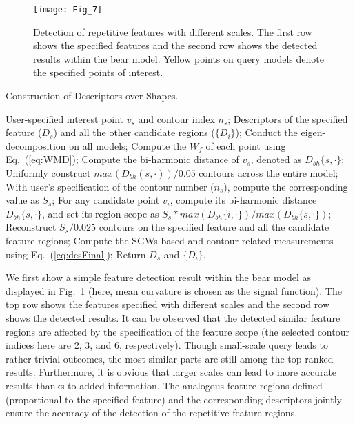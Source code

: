 \begin{figure}[!to]
\texttt{[image: Fig\_7]}
\caption[Detection of repetitive features with different scales.]
  {Detection of repetitive features with different scales. The
  first row shows the specified features and the second row shows the
  detected results within the bear model. Yellow points on query
  models denote the specified points of interest.}
\label{scales}
\end{figure}


\begin{algorithm}
\caption{Construction of Descriptors over Shapes.}
\label{alg:Framwork}
\begin{algorithmic}[1]
\REQUIRE User-specified interest point $v_{s}$ and contour index $n_{s}$;
\ENSURE  Descriptors of the specified feature ($D_{s}$) and all
         the other candidate regions ($\{D_{i}\}$);
\STATE Conduct the eigen-decomposition on all models;
\STATE Compute the $W_f$ of each point using Eq.~(\ref{eq:WMD});
\STATE Compute the bi-harmonic distance of $v_{s}$, denoted as $D_{bh}\{s,\cdot\}$;
\STATE Uniformly construct  $max(D_{bh}(s,\cdot))/0.05$ contours across the entire model;
\STATE With user's specification of the contour number ($n_{s}$), compute the corresponding value as $S_{s}$;
\STATE For any candidate point $v_{i}$, compute its bi-harmonic distance $D_{bh}\{s,\cdot\}$,
       and set its region scope as $S_{s}*max(D_{bh}\{i,\cdot\})/max(D_{bh}\{s,\cdot\})$;
\STATE Reconstruct $S_{s}/0.025$ contours on the specified feature and all the candidate feature regions;
\STATE Compute the SGWs-based and contour-related measurements using Eq.~(\ref{eq:desFinal});
\STATE Return $D_s$ and $\{D_{i}\}$.
\end{algorithmic}
\end{algorithm}

We first show a simple feature detection result within the bear model
as displayed in Fig.~\ref{scales} (here, mean curvature is chosen as
the signal function). The top row shows the features specified with
different scales and the second row shows the detected results. It can
be observed that the detected similar feature regions are affected by
the specification of the feature scope (the selected contour indices
here are 2, 3, and 6, respectively). Though small-scale query leads to
rather trivial outcomes, the most similar parts are still among the
top-ranked results. Furthermore, it is obvious that larger scales can
lead to more accurate results thanks to added information. The
analogous feature regions defined (proportional to the specified
feature) and the corresponding descriptors jointly ensure the accuracy
of the detection of the repetitive feature regions.

